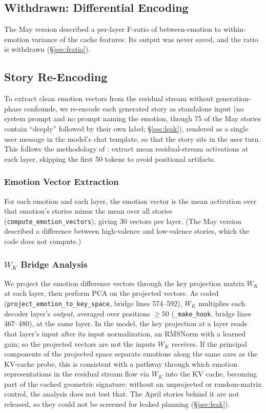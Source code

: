 \documentclass[11pt,a4paper]{article}
\begin{document}
\subsection{Withdrawn: Differential Encoding}

The May version described a per-layer F-ratio of between-emotion to within-emotion variance of the cache features. Its output was never saved, and the ratio is withdrawn (\S\ref{sec:fratio}).

\subsection{Story Re-Encoding}
\label{sec:reencoding}

To extract clean emotion vectors from the residual stream without generation-phase confounds, we re-encode each generated story as standalone input (no system prompt and no prompt naming the emotion, though 75 of the May stories contain ``deeply'' followed by their own label; \S\ref{sec:leak}), rendered as a single user message in the model's chat template, so that the story sits in the user turn. This follows the methodology of \citet{anthropic2026emotions}: extract mean residual-stream activations at each layer, skipping the first 50 tokens to avoid positional artifacts.

\subsubsection{Emotion Vector Extraction}

For each emotion and each layer, the emotion vector is the mean activation over that emotion's stories minus the mean over all stories (\texttt{compute\_emotion\_vectors}), giving 30 vectors per layer. (The May version described a difference between high-valence and low-valence stories, which the code does not compute.)

\subsubsection{$W_K$ Bridge Analysis}
\label{sec:bridge_method}

We project the emotion difference vectors through the key projection matrix $W_K$ at each layer, then perform PCA on the projected vectors. As coded (\texttt{project\_emotion\_to\_key\_space}, bridge lines 574--592), $W_K$ multiplies each decoder layer's \emph{output}, averaged over positions $\geq 50$ (\texttt{\_make\_hook}, bridge lines 467--480), at the same layer. In the model, the key projection at a layer reads that layer's input after its input normalization, an RMSNorm with a learned gain; so the projected vectors are not the inputs $W_K$ receives. If the principal components of the projected space separate emotions along the same axes as the KV-cache probe, this is consistent with a pathway through which emotion representations in the residual stream flow via $W_K$ into the KV cache, becoming part of the cached geometric signature; without an unprojected or random-matrix control, the analysis does not test that. The April stories behind it are not released, so they could not be screened for leaked planning (\S\ref{sec:leak}).
\end{document}
